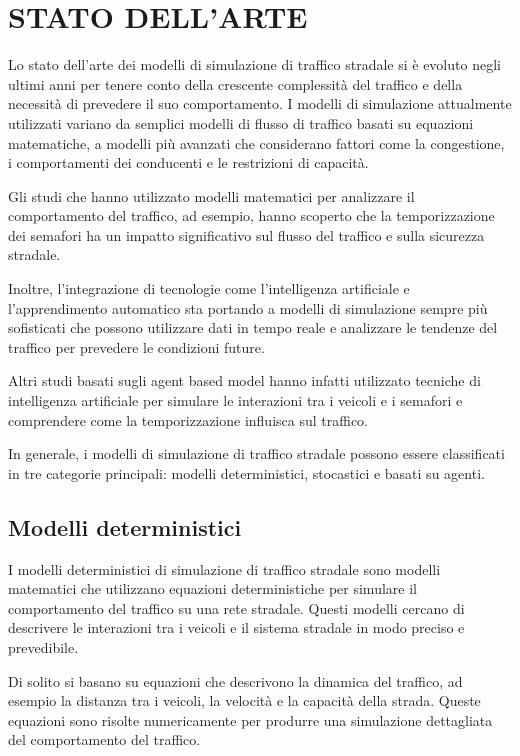 \documentclass[11pt]{article}
\begin{document}
\section{STATO DELL’ARTE}
Lo stato dell'arte dei modelli di simulazione di traffico stradale si è evoluto negli ultimi anni per tenere conto della crescente complessità del traffico e della necessità di prevedere il suo comportamento. I modelli di simulazione attualmente utilizzati variano da semplici modelli di flusso di traffico basati su equazioni matematiche, a modelli più avanzati che considerano fattori come la congestione, i comportamenti dei conducenti e le restrizioni di capacità.

Gli studi che hanno utilizzato modelli matematici per analizzare il comportamento del traffico, ad esempio, hanno scoperto che la temporizzazione dei semafori ha un impatto significativo sul flusso del traffico e sulla sicurezza stradale.

Inoltre, l'integrazione di tecnologie come l'intelligenza artificiale e l'apprendimento automatico sta portando a modelli di simulazione sempre più sofisticati che possono utilizzare dati in tempo reale e analizzare le tendenze del traffico per prevedere le condizioni future.

Altri studi basati sugli agent based model hanno infatti utilizzato tecniche di intelligenza artificiale per simulare le interazioni tra i veicoli e i semafori e comprendere come la temporizzazione influisca sul traffico.

In generale, i modelli di simulazione di traffico stradale possono essere classificati in tre categorie principali: modelli deterministici, stocastici e basati su agenti.

\subsection{Modelli deterministici}
I modelli deterministici di simulazione di traffico stradale sono modelli matematici che utilizzano equazioni deterministiche per simulare il comportamento del traffico su una rete stradale. Questi modelli cercano di descrivere le interazioni tra i veicoli e il sistema stradale in modo preciso e prevedibile.

Di solito si basano su equazioni che descrivono la dinamica del traffico, ad esempio la distanza tra i veicoli, la velocità e la capacità della strada. Queste equazioni sono risolte numericamente per produrre una simulazione dettagliata del comportamento del traffico.
\end{document}
